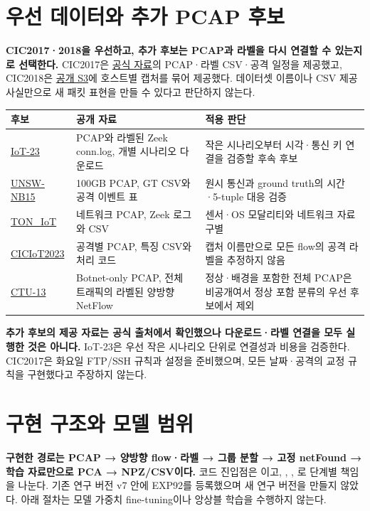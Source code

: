 \section{우선 데이터와 추가 PCAP 후보}
\textbf{CIC2017·2018을 우선하고, 추가 후보는 PCAP과 라벨을 다시 연결할 수 있는지로 선택한다.} CIC2017은 \href{https://www.unb.ca/cic/datasets/ids-2017.html}{공식 자료}의 PCAP·라벨 CSV·공격 일정을 제공했고, CIC2018은 \href{https://registry.opendata.aws/cse-cic-ids2018/}{공개 S3}에 호스트별 캡처를 묶어 제공했다. 데이터셋 이름이나 CSV 제공 사실만으로 새 패킷 표현을 만들 수 있다고 판단하지 않는다.
\begin{tabularx}{\linewidth}{p{.15\linewidth}YY}
\toprule 후보 & 공개 자료 & 적용 판단\\\midrule
\href{https://www.stratosphereips.org/datasets-iot23}{IoT-23} & PCAP와 라벨된 Zeek conn.log, 개별 시나리오 다운로드 & 작은 시나리오부터 시각·통신 키 연결을 검증할 후속 후보\\
\href{https://research.unsw.edu.au/projects/unsw-nb15-dataset}{UNSW-NB15} & 100GB PCAP, GT CSV와 공격 이벤트 표 & 원시 통신과 ground truth의 시간·5-tuple 대응 검증\\
\href{https://research.unsw.edu.au/projects/toniot-datasets}{TON\_IoT} & 네트워크 PCAP, Zeek 로그와 CSV & 센서·OS 모달리티와 네트워크 자료 구별\\
\href{https://www.unb.ca/cic/datasets/iotdataset-2023.html}{CICIoT2023} & 공격별 PCAP, 특징 CSV와 처리 코드 & 캡처 이름만으로 모든 flow의 공격 라벨을 추정하지 않음\\
\href{https://www.stratosphereips.org/datasets-ctu13}{CTU-13} & Botnet-only PCAP, 전체 트래픽의 라벨된 양방향 NetFlow & 정상·배경을 포함한 전체 PCAP은 비공개여서 정상 포함 분류의 우선 후보에서 제외\\
\bottomrule
\end{tabularx}
\textbf{추가 후보의 제공 자료는 공식 출처에서 확인했으나 다운로드·라벨 연결을 모두 실행한 것은 아니다.} IoT-23은 우선 작은 시나리오 단위로 연결성과 비용을 검증한다. CIC2017은 화요일 FTP/SSH 규칙과 설정을 준비했으며, 모든 날짜·공격의 교정 규칙을 구현했다고 주장하지 않는다.

\section{구현 구조와 모델 범위}
\textbf{구현한 경로는 PCAP → 양방향 flow·라벨 → 그룹 분할 → 고정 netFound → 학습 자료만으로 PCA → NPZ/CSV이다.} 코드 진입점은 이고, , , 로 단계별 책임을 나눈다. 기존 연구 버전 v7 안에 EXP92를 등록했으며 새 연구 버전을 만들지 않았다. 아래 절차는 모델 가중치 fine-tuning이나 앙상블 학습을 수행하지 않는다.

